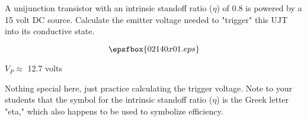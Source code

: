 

A unijunction transistor with an intrinsic standoff ratio ($\eta$) of 0.8 is powered by a 15 volt DC source.  Calculate the emitter voltage needed to "trigger" this UJT into its conductive state.

$$\epsfbox{02140x01.eps}$$







$V_P \approx$ 12.7 volts







Nothing special here, just practice calculating the trigger voltage.  Note to your students that the symbol for the intrinsic standoff ratio ($\eta$) is the Greek letter "eta," which also happens to be used to symbolize efficiency. 




